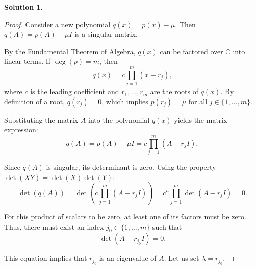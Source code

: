 \documentclass[12pt]{article}
\theoremstyle{definition}
\newtheorem*{solution}{\normalfont\textbf{Solution}}
\begin{document}
\begin{enumerate}[leftmargin=*]
\begin{solution}
\begin{proof}
                Consider a new polynomial $q(x) = p(x) - \mu$. Then $q(A) = p(A) - \mu I$ is a singular matrix.

                By the Fundamental Theorem of Algebra, $q(x)$ can be factored over $\mathbb{C}$ into linear terms. If $\deg(p) = m$, then
                \[ 
                q(x) = c \prod_{j=1}^m (x - r_j) ,
                \]
                where $c$ is the leading coefficient and $r_1, \dots, r_m$ are the roots of $q(x)$. By definition of a root, $q(r_j) = 0$, which implies $p(r_j) = \mu$ for all $j \in \{1, \dots, m\}$.

                Substituting the matrix $A$ into the polynomial $q(x)$ yields the matrix expression:
                \[ 
                q(A) = p(A) - \mu I = c \prod_{j=1}^m (A - r_j I) ,
                \]

                Since $q(A)$ is singular, its determinant is zero. Using the property $\det(XY) = \det(X)\det(Y)$:
                \[ 
                \det(q(A)) = \det\left(c \prod_{j=1}^m (A - r_j I)\right) = c^n \prod_{j=1}^m \det(A - r_j I) = 0 
                .\]
                
                For this product of scalars to be zero, at least one of its factors must be zero. Thus, there must exist an index $j_0 \in \{1, \dots, m\}$ such that
                \[ 
                \det(A - r_{j_0} I) = 0.
                \]

                This equation implies that $r_{j_0}$ is an eigenvalue of $A$. Let us set $\lambda = r_{j_0}$.


\end{proof}
\end{solution}
\end{enumerate}
\end{document}
